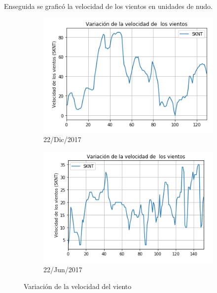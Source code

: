 \documentclass{article}
\begin{document}
\newpage

Enseguida se graficó la velocidad de los vientos en unidades de nudo.
\begin{figure}[h!]
	\begin{subfigure}[b]{0.5\linewidth}
    \raggedleft
	\includegraphics[width=\linewidth]{6thInstDec.png}
    \caption{22/Dic/2017}
	\end{subfigure}
	\begin{subfigure}[b]{0.5\linewidth}
    \raggedright
	\includegraphics[width=\linewidth]{6thInstJun.png}
    \caption{22/Jun/2017}
	\end{subfigure}
    \caption{Variación de la velocidad del viento}
\end{figure}
\end{document}
